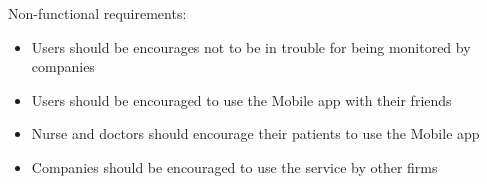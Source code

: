 Non-functional requirements:
\begin{itemize}
    \item Users should be encourages not to be in trouble for being monitored by companies
    \item Users should be encouraged to use the Mobile app with their friends
    \item Nurse and doctors should encourage their patients to use the Mobile app 
    \item Companies should be encouraged to use the service by other firms
\end{itemize}